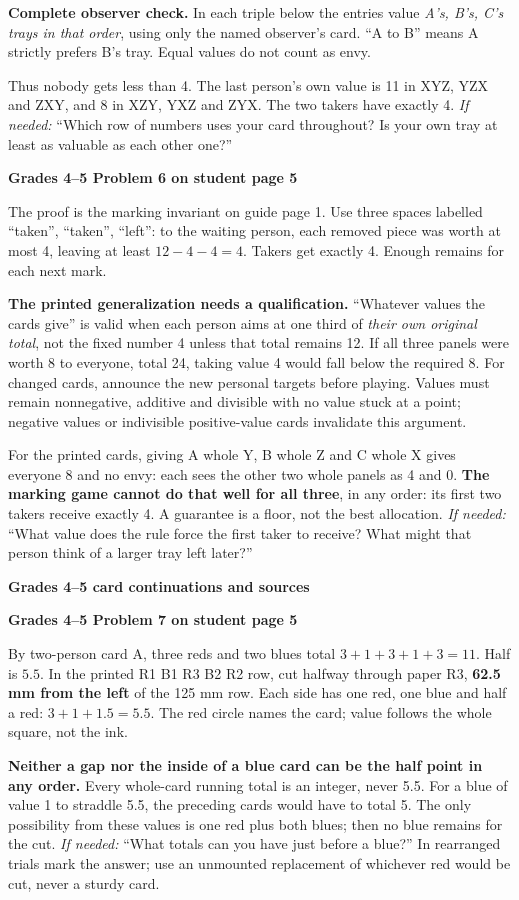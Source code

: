 \documentclass[11pt]{article}
\newcommand{\head}[1]{\par\textbf{\large #1}\par}
\newcommand{\sub}[1]{\par\textbf{#1}\par}
\newcommand{\hint}[1]{\textit{If needed:} #1}
\begin{document}
\textbf{Complete observer check.} In each triple below the entries value \emph{A's, B's, C's trays in that order}, using only the named observer's card. ``A to B'' means A strictly prefers B's tray. Equal values do not count as envy.
\begin{center}\small\setlength{\tabcolsep}{5pt}\scoretable\end{center}
Thus nobody gets less than 4. The last person's own value is 11 in XYZ, YZX and ZXY, and 8 in XZY, YXZ and ZYX. The two takers have exactly 4. \hint{``Which row of numbers uses your card throughout? Is your own tray at least as valuable as each other one?''}

\sub{Grades 4--5 Problem 6 on student page 5}
The proof is the marking invariant on guide page 1. Use three spaces labelled ``taken'', ``taken'', ``left'': to the waiting person, each removed piece was worth at most 4, leaving at least $12-4-4=4$. Takers get exactly 4. Enough remains for each next mark.

\textbf{The printed generalization needs a qualification.} ``Whatever values the cards give'' is valid when each person aims at one third of \emph{their own original total}, not the fixed number 4 unless that total remains 12. If all three panels were worth 8 to everyone, total 24, taking value 4 would fall below the required 8. For changed cards, announce the new personal targets before playing. Values must remain nonnegative, additive and divisible with no value stuck at a point; negative values or indivisible positive-value cards invalidate this argument.

For the printed cards, giving A whole Y, B whole Z and C whole X gives everyone 8 and no envy: each sees the other two whole panels as 4 and 0. \textbf{The marking game cannot do that well for all three}, in any order: its first two takers receive exactly 4. A guarantee is a floor, not the best allocation. \hint{``What value does the rule force the first taker to receive? What might that person think of a larger tray left later?''}
\newpage
\head{Grades 4--5 card continuations and sources}
\sub{Grades 4--5 Problem 7 on student page 5}
By two-person card A, three reds and two blues total $3+1+3+1+3=11$. Half is $5.5$. In the printed R1 B1 R3 B2 R2 row, cut halfway through paper R3, \textbf{62.5 mm from the left} of the 125 mm row. Each side has one red, one blue and half a red: $3+1+1.5=5.5$. The red circle names the card; value follows the whole square, not the ink.

\textbf{Neither a gap nor the inside of a blue card can be the half point in any order.} Every whole-card running total is an integer, never 5.5. For a blue of value 1 to straddle 5.5, the preceding cards would have to total 5. The only possibility from these values is one red plus both blues; then no blue remains for the cut. \hint{``What totals can you have just before a blue?''} In rearranged trials mark the answer; use an unmounted replacement of whichever red would be cut, never a sturdy card.
\end{document}
